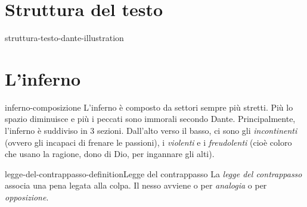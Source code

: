 \documentclass[preview]{standalone}
\begin{document}
\genpage

\section{Struttura del testo}

\begin{snippet}{struttura-testo-dante-illustration}
    \begin{center}
    \end{center}
    \phantom{}
\end{snippet}

\section{L'inferno}

\begin{snippet}{inferno-composizione}
    L'inferno è composto da settori sempre più stretti. Più lo spazio diminuisce e più i peccati sono immorali
    secondo Dante.
    Principalmente, l'inferno è suddiviso in 3 sezioni.
    Dall'alto verso il basso, ci sono gli \textit{incontinenti} (ovvero gli incapaci di frenare le passioni),
    i \textit{violenti} e i \textit{freudolenti} (cioè coloro che usano la ragione, dono di Dio, per ingannare gli alti).
\end{snippet}

\begin{snippetdefinition}{legge-del-contrappasso-definition}{Legge del contrappasso}
    La \textit{legge del contrappasso} associa una pena
    legata alla colpa.
    Il nesso avviene o per \textit{analogia} o per \textit{opposizione}.
\end{snippetdefinition}
\end{document}
